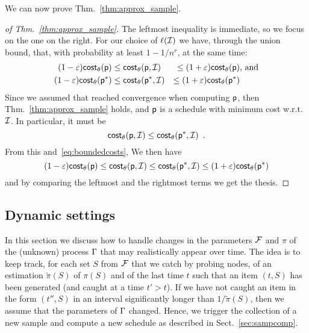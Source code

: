 We can now prove Thm.~\ref{thm:approx_sample}.
\begin{proof}[of Thm.~\ref{thm:approx_sample}]
	The leftmost inequality is immediate, so we focus on the one on the right.
	For our choice of $\ell(\mathcal{I})$ we have, through the union bound, that,
	with probability at least $1-1/n^r$, at the same time:
	\begin{align}\label{eq:boundedcosts}
		(1-\varepsilon)\mathsf{cost}_\theta(\mathsf{p})&\leq \mathsf{cost}_\theta(\mathsf{p},\mathcal{I}) &\le
		(1+\varepsilon)\mathsf{cost}_\theta(\mathsf{p}) & \mbox{, and}\nonumber\\
		(1-\varepsilon)\mathsf{cost}_\theta(\mathsf{p}^*)&\leq \mathsf{cost}_\theta(\mathsf{p}^*,\mathcal{I}) &\le
		(1+\varepsilon)\mathsf{cost}_\theta(\mathsf{p}^*)&
	\end{align}
	Since we assumed that \algonameapx reached convergence when computing
	$\mathsf{p}$, then Thm.~\ref{thm:approx_sample} holds, and $\mathsf{p}$ is a
	schedule with minimum cost w.r.t.~$\mathcal{I}$. In particular, it must be
	\[
		\mathsf{cost}_\theta(\mathsf{p},\mathcal{I})\le \mathsf{cost}_\theta(\mathsf{p}^*,\mathcal{I})\enspace.
	\]
	From this and~\eqref{eq:boundedcosts}, We then have
	\[
		(1-\varepsilon)\mathsf{cost}_\theta(\mathsf{p})\leq \mathsf{cost}_\theta(\mathsf{p},\mathcal{I}) \le
		\mathsf{cost}_\theta(\mathsf{p}^*,\mathcal{I})\le (1+\varepsilon)\mathsf{cost}_\theta(\mathsf{p}^*)
	\]
	and by comparing the leftmost and the rightmost terms we get the thesis.
\end{proof}


\subsection{Dynamic settings}\label{sec:dynamic}
In this section we discuss how to handle changes in the parameters $\mathcal{F}$ and
$\pi$ of the (unknown) process $\Gamma$ that may realistically appear over time.
The idea is to keep track, for each set $S$ from $\mathcal{F}$ that we catch by
probing nodes, of an estimation $\tilde{\pi}(S)$ of $\pi(S)$ and of the last
time $t$ such that an item $(t,S)$ has been generated (and caught at a time
$t'>t$). If we have not caught an item in the form $(t'',S)$ in an interval
significantly longer than $1/\tilde{\pi}(S)$, then we assume that
the parameters of $\Gamma$ changed. Hence, we trigger the collection of a new
sample and compute a new schedule as described in Sect.~\ref{sec:sampcomp}.

